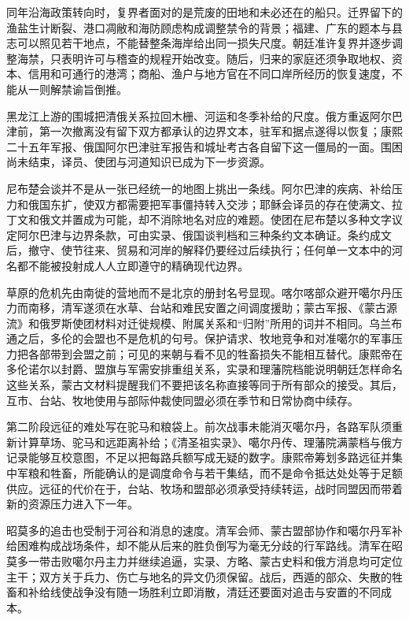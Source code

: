 同年沿海政策转向时，复界者面对的是荒废的田地和未必还在的船只。迁界留下的渔盐生计断裂、港口凋敝和海防顾虑构成调整禁令的背景；福建、广东的题本与县志可以照见若干地点，不能替整条海岸给出同一损失尺度。朝廷准许复界并逐步调整海禁，只表明许可与稽查的规程开始改变。随后，归来的家庭还须争取地权、资本、信用和可通行的港湾；商船、渔户与地方官在不同口岸所经历的恢复速度，不能从一则解禁谕旨倒推。

黑龙江上游的围城把清俄关系拉回木栅、河运和冬季补给的尺度。俄方重返阿尔巴津前，第一次撤离没有留下双方都承认的边界文本，驻军和据点遂得以恢复；康熙二十五年军报、俄国阿尔巴津驻军报告和城址考古各自留下这一僵局的一面。围困尚未结束，译员、使团与河道知识已成为下一步资源。

尼布楚会谈并不是从一张已经统一的地图上挑出一条线。阿尔巴津的疾病、补给压力和俄国东扩，使双方都需要把军事僵持转入交涉；耶稣会译员的存在使满文、拉丁文和俄文并置成为可能，却不消除地名对应的难题。使团在尼布楚以多种文字议定阿尔巴津与边界条款，可由实录、俄国谈判档和三种条约文本确证。条约成文后，撤守、使节往来、贸易和河岸的解释仍要经过后续执行；任何单一文本中的河名都不能被投射成人人立即遵守的精确现代边界。

草原的危机先由南徙的营地而不是北京的册封名号显现。喀尔喀部众避开噶尔丹压力而南移，清军遂须在水草、台站和难民安置之间调度援助；蒙古军报、《蒙古源流》和俄罗斯使团材料对迁徙规模、附属关系和“归附”所用的词并不相同。乌兰布通之后，多伦的会盟也不是危机的句号。保护请求、牧地竞争和对准噶尔的军事压力把各部带到会盟之前；可见的来朝与看不见的牲畜损失不能相互替代。康熙帝在多伦诺尔以封爵、盟旗与军需安排重组关系，实录和理藩院档能说明朝廷怎样命名这些关系，蒙古文材料提醒我们不要把该名称直接等同于所有部众的接受。其后，互市、台站、牧地使用与部际仲裁使同盟必须在季节和日常协商中续存。

第二阶段远征的难处写在驼马和粮袋上。前次战事未能消灭噶尔丹，各路军队须重新计算草场、驼马和远距离补给；《清圣祖实录》、噶尔丹传、理藩院满蒙档与俄方记录能够互校意图，不足以把每路兵额写成无疑的数字。康熙帝筹划多路远征并集中军粮和牲畜，所能确认的是调度命令与若干集结，而不是命令抵达处处等于足额供应。远征的代价在于，台站、牧场和盟部必须承受持续转运，战时同盟因而带着新的资源压力进入下一年。

昭莫多的追击也受制于河谷和消息的速度。清军会师、蒙古盟部协作和噶尔丹军补给困难构成战场条件，却不能从后来的胜负倒写为毫无分歧的行军路线。清军在昭莫多一带击败噶尔丹主力并继续追逼，实录、方略、蒙古史料和俄方消息均可定位主干；双方关于兵力、伤亡与地名的异文仍须保留。战后，西遁的部众、失散的牲畜和补给线使战争没有随一场胜利立即消散，清廷还要面对追击与安置的不同成本。

